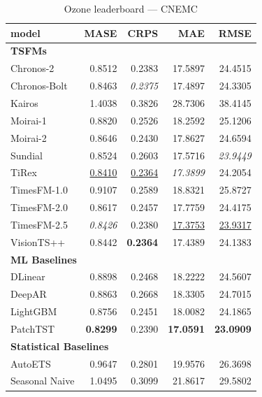 \begin{table}[H]
\caption{Ozone leaderboard --- CNEMC}
\centering
\begin{small}
\begin{tabular}{lrrrr}
\toprule
model & MASE & CRPS & MAE & RMSE \\
\midrule
\multicolumn{5}{l}{\textbf{TSFMs}} \\
Chronos-2 & 0.8512 & 0.2383 & 17.5897 & 24.4515 \\
Chronos-Bolt & 0.8463 & \textit{0.2375} & 17.4897 & 24.3305 \\
Kairos & 1.4038 & 0.3826 & 28.7306 & 38.4145 \\
Moirai-1 & 0.8820 & 0.2526 & 18.2592 & 25.1206 \\
Moirai-2 & 0.8646 & 0.2430 & 17.8627 & 24.6594 \\
Sundial & 0.8524 & 0.2603 & 17.5716 & \textit{23.9449} \\
TiRex & \underline{0.8410} & \underline{0.2364} & \textit{17.3899} & 24.2054 \\
TimesFM-1.0 & 0.9107 & 0.2589 & 18.8321 & 25.8727 \\
TimesFM-2.0 & 0.8617 & 0.2457 & 17.7759 & 24.4175 \\
TimesFM-2.5 & \textit{0.8426} & 0.2380 & \underline{17.3753} & \underline{23.9317} \\
VisionTS++ & 0.8442 & \textbf{0.2364} & 17.4389 & 24.1383 \\
\midrule
\multicolumn{5}{l}{\textbf{ML Baselines}} \\
DLinear & 0.8898 & 0.2468 & 18.2222 & 24.5607 \\
DeepAR & 0.8863 & 0.2668 & 18.3305 & 24.7015 \\
LightGBM & 0.8756 & 0.2451 & 18.0082 & 24.1865 \\
PatchTST & \textbf{0.8299} & 0.2390 & \textbf{17.0591} & \textbf{23.0909} \\
\midrule
\multicolumn{5}{l}{\textbf{Statistical Baselines}} \\
AutoETS & 0.9647 & 0.2801 & 19.9576 & 26.3698 \\
Seasonal Naive & 1.0495 & 0.3099 & 21.8617 & 29.5802 \\
\bottomrule
\end{tabular}
\end{small}
\end{table}
